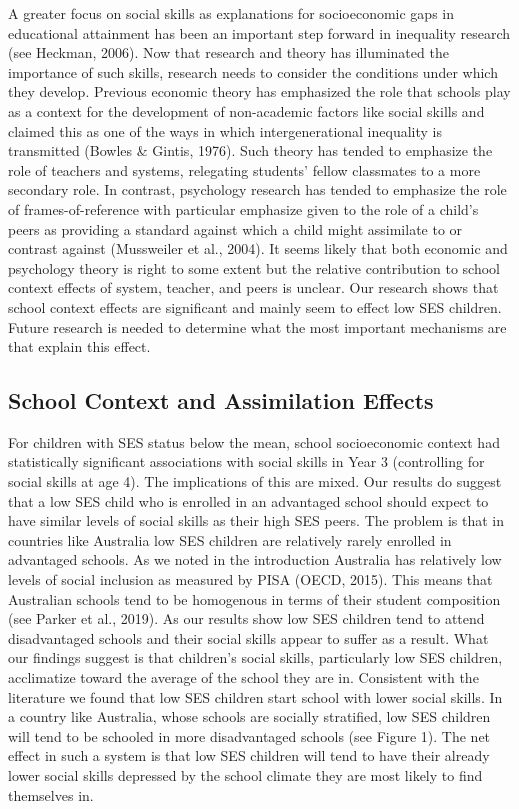 \documentclass[
  english,
  man]{apa6}
\begin{document}
A greater focus on social skills as explanations for socioeconomic gaps in educational attainment has been an important step forward in inequality research (see Heckman, 2006). Now that research and theory has illuminated the importance of such skills, research needs to consider the conditions under which they develop. Previous economic theory has emphasized the role that schools play as a context for the development of non-academic factors like social skills and claimed this as one of the ways in which intergenerational inequality is transmitted (Bowles \& Gintis, 1976). Such theory has tended to emphasize the role of teachers and systems, relegating students' fellow classmates to a more secondary role. In contrast, psychology research has tended to emphasize the role of frames-of-reference with particular emphasize given to the role of a child's peers as providing a standard against which a child might assimilate to or contrast against (Mussweiler et al., 2004). It seems likely that both economic and psychology theory is right to some extent but the relative contribution to school context effects of system, teacher, and peers is unclear. Our research shows that school context effects are significant and mainly seem to effect low SES children. Future research is needed to determine what the most important mechanisms are that explain this effect.

\hypertarget{school-context-and-assimilation-effects}{%
\subsection{School Context and Assimilation Effects}\label{school-context-and-assimilation-effects}}

For children with SES status below the mean, school socioeconomic context had statistically significant associations with social skills in Year 3 (controlling for social skills at age 4). The implications of this are mixed. Our results do suggest that a low SES child who is enrolled in an advantaged school should expect to have similar levels of social skills as their high SES peers. The problem is that in countries like Australia low SES children are relatively rarely enrolled in advantaged schools. As we noted in the introduction Australia has relatively low levels of social inclusion as measured by PISA (OECD, 2015). This means that Australian schools tend to be homogenous in terms of their student composition (see Parker et al., 2019). As our results show low SES children tend to attend disadvantaged schools and their social skills appear to suffer as a result. What our findings suggest is that children's social skills, particularly low SES children, acclimatize toward the average of the school they are in. Consistent with the literature we found that low SES children start school with lower social skills. In a country like Australia, whose schools are socially stratified, low SES children will tend to be schooled in more disadvantaged schools (see Figure 1). The net effect in such a system is that low SES children will tend to have their already lower social skills depressed by the school climate they are most likely to find themselves in.
\end{document}
